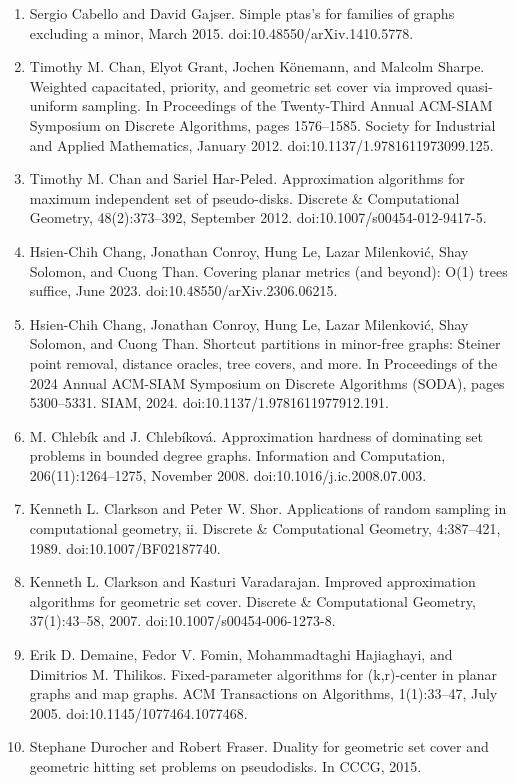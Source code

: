 \documentclass[10pt,a4paper]{article}
\begin{document}
\begin{enumerate}
\item[]  [10]  Sergio Cabello and David Gajser.  Simple ptas’s for families of graphs excluding a minor, March 2015.  doi:10.48550/arXiv.1410.5778.  
\item[]  [11]  Timothy M. Chan, Elyot Grant, Jochen Könemann, and Malcolm Sharpe.  Weighted capacitated, priority, and geometric set cover via improved quasi-uniform sampling.  In Proceedings of the Twenty-Third Annual ACM-SIAM Symposium on Discrete Algorithms, pages 1576–1585. Society for Industrial and Applied Mathematics, January 2012.  doi:10.1137/1.9781611973099.125.  
\item[]  [12]  Timothy M. Chan and Sariel Har-Peled.  Approximation algorithms for maximum independent set of pseudo-disks.  Discrete \& Computational Geometry, 48(2):373–392, September 2012.  doi:10.1007/s00454-012-9417-5.  
\item[]  [13]  Hsien-Chih Chang, Jonathan Conroy, Hung Le, Lazar Milenković, Shay Solomon, and Cuong Than.  Covering planar metrics (and beyond): O(1) trees suffice, June 2023.  doi:10.48550/arXiv.2306.06215.  
\item[]  [14]  Hsien-Chih Chang, Jonathan Conroy, Hung Le, Lazar Milenković, Shay Solomon, and Cuong Than.  Shortcut partitions in minor-free graphs: Steiner point removal, distance oracles, tree covers, and more.  In Proceedings of the 2024 Annual ACM-SIAM Symposium on Discrete Algorithms (SODA), pages 5300–5331. SIAM, 2024.  doi:10.1137/1.9781611977912.191.  
\item[]  [15]  M. Chlebík and J. Chlebíková.  Approximation hardness of dominating set problems in bounded degree graphs.  Information and Computation, 206(11):1264–1275, November 2008.  doi:10.1016/j.ic.2008.07.003.  
\item[]  [16]  Kenneth L. Clarkson and Peter W. Shor.  Applications of random sampling in computational geometry, ii.  Discrete \& Computational Geometry, 4:387–421, 1989.  doi:10.1007/BF02187740.  
\item[]  [17]  Kenneth L. Clarkson and Kasturi Varadarajan.  Improved approximation algorithms for geometric set cover.  Discrete \& Computational Geometry, 37(1):43–58, 2007.  doi:10.1007/s00454-006-1273-8.  
\item[]  [18]  Erik D. Demaine, Fedor V. Fomin, Mohammadtaghi Hajiaghayi, and Dimitrios M. Thilikos.  Fixed-parameter algorithms for (k,r)-center in planar graphs and map graphs.  ACM Transactions on Algorithms, 1(1):33–47, July 2005.  doi:10.1145/1077464.1077468.  
\item[]  [19]  Stephane Durocher and Robert Fraser.  Duality for geometric set cover and geometric hitting set problems on pseudodisks.  In CCCG, 2015.  

\end{enumerate}
\end{document}
